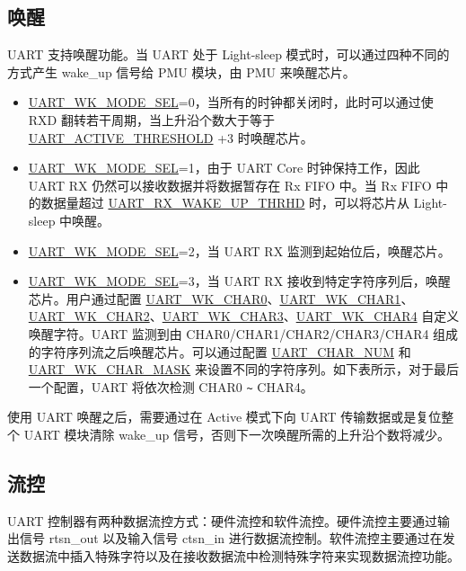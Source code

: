 \documentclass[main\_\_CN.tex]{subfiles}
\begin{document}
\subsection{唤醒}\label{sec:uart-wakeup}

UART 支持唤醒功能。当 UART 处于 Light-sleep 模式时，可以通过四种不同的方式产生 wake\_up 信号给 PMU 模块，由 PMU 来唤醒芯片。
\begin{itemize}
\item \hyperref[fielddesc:UARTWKMODESEL]{UART\_WK\_MODE\_SEL}=0，当所有的时钟都关闭时，此时可以通过使 RXD 翻转若干周期，当上升沿个数大于等于 \hyperref[fielddesc:UARTACTIVETHRESHOLD]{UART\_ACTIVE\_THRESHOLD} +3 时唤醒芯片。
\item \hyperref[fielddesc:UARTWKMODESEL]{UART\_WK\_MODE\_SEL}=1，由于 UART Core 时钟保持工作，因此 UART RX
仍然可以接收数据并将数据暂存在 Rx FIFO 中。当 Rx FIFO 中的数据量超过 \hyperref[fielddesc:UARTRXWAKEUPTHRHD]{UART\_RX\_WAKE\_UP\_THRHD} 时，可以将芯片从 Light-sleep 中唤醒。
\item \hyperref[fielddesc:UARTWKMODESEL]{UART\_WK\_MODE\_SEL}=2，当 UART RX 监测到起始位后，唤醒芯片。
\item \hyperref[fielddesc:UARTWKMODESEL]{UART\_WK\_MODE\_SEL}=3，当 UART RX 接收到特定字符序列后，唤醒芯片。用户通过配置 \hyperref[fielddesc:UARTWKCHAR0]{UART\_WK\_CHAR0}、\hyperref[fielddesc:UARTWKCHAR1]{UART\_WK\_CHAR1}、\hyperref[fielddesc:UARTWKCHAR2]{UART\_WK\_CHAR2}、\hyperref[fielddesc:UARTWKCHAR3]{UART\_WK\_CHAR3}、\hyperref[fielddesc:UARTWKCHAR4]{UART\_WK\_CHAR4} 自定义唤醒字符。UART 监测到由 CHAR0/CHAR1/CHAR2/CHAR3/CHAR4 组成的字符序列流之后唤醒芯片。可以通过配置 \hyperref[fielddesc:UARTCHARNUM]{UART\_CHAR\_NUM} 和 \hyperref[fielddesc:UARTWKCHARMASK]{UART\_WK\_CHAR\_MASK} 来设置不同的字符序列。如下表所示，对于最后一个配置，UART 将依次检测 CHAR0 \verb+~+ CHAR4。
\end{itemize}



使用 UART 唤醒之后，需要通过在 Active 模式下向 UART 传输数据或是复位整个 UART 模块清除 wake\_up 信号，否则下一次唤醒所需的上升沿个数将减少。

\subsection{流控}

UART 控制器有两种数据流控方式：硬件流控和软件流控。硬件流控主要通过输出信号 rtsn\_out 以及输入信号 ctsn\_in 进行数据流控制。软件流控主要通过在发送数据流中插入特殊字符以及在接收数据流中检测特殊字符来实现数据流控功能。
\end{document}
